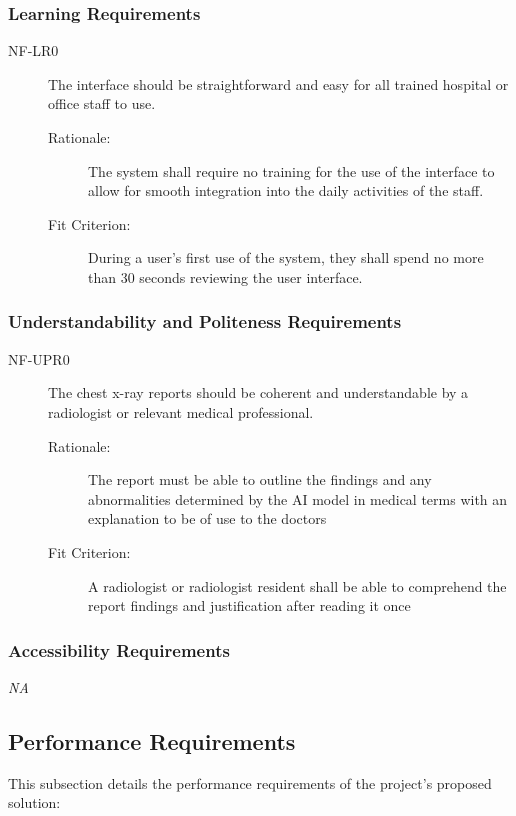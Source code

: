 \documentclass[12pt]{article}
\begin{document}
\subsubsection{Learning Requirements}
\begin{description}
    \item[NF-LR0] The interface should be straightforward and easy for all trained hospital or office staff to use.  
    \begin{description}
        \item[Rationale:] The system shall require no training for the use of the interface to allow for smooth integration into the daily activities of the staff.
        \item[Fit Criterion:] During a user's first use of the system, they shall spend no more than 30 seconds reviewing the user interface.
    \end{description}
\end{description}


\subsubsection{Understandability and Politeness Requirements}
\begin{description}
    \item[NF-UPR0] The chest x-ray reports should be coherent and understandable by a radiologist or relevant medical professional. 
    \begin{description}
        \item[Rationale:] The report must be able to outline the findings and any abnormalities determined by the AI model in medical terms with an explanation to be of use to the doctors
        \item[Fit Criterion:] A radiologist or radiologist resident shall be able to comprehend the report findings and justification after reading it once
    \end{description}
\end{description}

\subsubsection{Accessibility Requirements}
\textit{NA}

\subsection{Performance Requirements}
This subsection details the performance requirements of the project's proposed solution:
\end{document}
